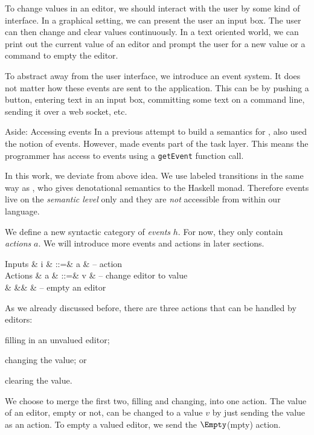 To change values in an editor,
we should interact with the user by some kind of interface.
In a graphical setting,
we can present the user an input box.
The user can then change and clear values continuously.
In a text oriented world,
we can print out the current value of an editor
and prompt the user for a new value
or a command to empty the editor.

To abstract away from the user interface,
we introduce an event system.
It does not matter how these events are sent to the application.
This can be by pushing a button,
entering text in an input box,
committing some text on a command line,
sending it over a web socket,
etc.

\begin{margintext}{Aside: Accessing events}
In a previous attempt to build a semantics for \TOP,
\textcite{theses/radboud/VinterHviid18} also used the notion of events.
However, \citeauthor{theses/radboud/VinterHviid18} made events part of the task layer.
This means the programmer has access to events using a \texttt{getEvent} function call.

In this work,
we deviate from above idea.
We use labeled transitions in the same way as \textcite{school/maktoberdorf/PeytonJones01},
who gives denotational semantics to the Haskell \IO monad.
Therefore events live on the \emph{semantic level} only
and they are \emph{not} accessible from within our language.
\end{margintext}

We define a new syntactic category of \emph{events} $h$.
For now, they only contain \emph{actions} $a$.
We will introduce more events and actions in later sections.
\begin{grammar}
  Inputs
    & i & ::=& a      & – action \\
  Actions
    & a & ::=& v      & – change editor to value \\
    &   &\mid& \Empty & – empty an editor \\
\end{grammar}

As we already discussed before,
there are three actions that can be handled by editors:
\begin{enumerate*}
  \item filling in an unvalued editor;
  \item changing the value; or
  \item clearing the value.
\end{enumerate*}
We choose to merge the first two, filling and changing, into one action.
The value of an editor, empty or not, can be changed to a value $v$ by just sending the value as an action.
To empty a valued editor, we send the $\Empty$(mpty) action.

